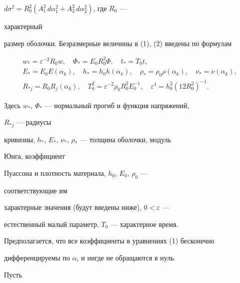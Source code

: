 $d\sigma^2=R^2_0(A^2_1\,d\alpha^2_1+A^2_2\,d\alpha^2_2)$, где $R_0$ --- 


характерный 


размер оболочки. Безразмерные величины в (1), (2) введены по формулам 


\begin{gather*} 


w_*=\varepsilon^{-2}R_0w,\quad \Phi_*=E_0R^2_0\Phi,\quad 


t_*=T_0t,\\ 


E_*=E_0E(\alpha_k),\quad h_*=h_0h(\alpha_k),\quad 


\rho_*=\rho_0\rho(\alpha_k),\quad \nu_*=\nu(\alpha_k),\\ 


R_{*j}=R_0R_j(\alpha_k),\quad 


T^2_0=\varepsilon^{-2}\rho_0R^2_0E^{-1}_0,\quad 


\varepsilon^4=h^2_0(12R^2_0)^{-1}. 


\end{gather*} 


Здесь $w_*$, $\Phi_*$ --- нормальный прогиб и функция напряжений, 


$R_{*j}$ --- радиусы 


кривизны, $h_*$, $E_*$, $\nu_*$, $\rho_*$ --- толщина оболочки, модуль 


Юнга, коэффициент 


Пуассона и плотность материала, $h_0$, $E_0$, $\rho_0$ --- 


соответствующие им 


характерные значения (будут введены ниже), $0<\varepsilon$ --- 


естественный малый параметр, $T_0$ --- характерное время. 


 


Предполагается, что все коэффициенты в уравнениях (1) бесконечно 


дифференцируемы по $\alpha_i$ и нигде не обращаются в нуль. 


 


Пусть 


